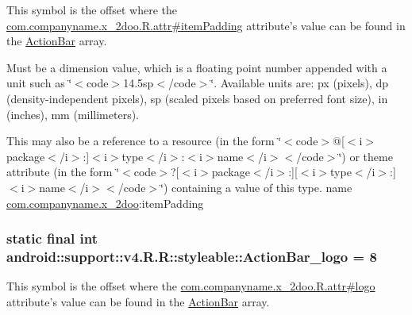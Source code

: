 This symbol is the offset where the \hyperlink{classcom_1_1companyname_1_1x__2doo_1_1_r_1_1attr_7e7c0aab964f70ae22793222d508c798}{com.companyname.x\_\-2doo.R.attr\#itemPadding} attribute's value can be found in the \hyperlink{classandroid_1_1support_1_1v4_1_1_r_1_1styleable_5c6cf2c83551ebae05f365bb913fdddf}{ActionBar} array.

Must be a dimension value, which is a floating point number appended with a unit such as \char`\"{}$<$code$>$14.5sp$<$/code$>$\char`\"{}. Available units are: px (pixels), dp (density-independent pixels), sp (scaled pixels based on preferred font size), in (inches), mm (millimeters). 

This may also be a reference to a resource (in the form \char`\"{}$<$code$>$@\mbox{[}$<$i$>$package$<$/i$>$:\mbox{]}$<$i$>$type$<$/i$>$:$<$i$>$name$<$/i$>$$<$/code$>$\char`\"{}) or theme attribute (in the form \char`\"{}$<$code$>$?\mbox{[}$<$i$>$package$<$/i$>$:\mbox{]}\mbox{[}$<$i$>$type$<$/i$>$:\mbox{]}$<$i$>$name$<$/i$>$$<$/code$>$\char`\"{}) containing a value of this type.  name \hyperlink{namespacecom_1_1companyname_1_1x__2doo}{com.companyname.x\_\-2doo}:itemPadding \hypertarget{classandroid_1_1support_1_1v4_1_1_r_1_1styleable_239d55172c67152fbf4c566f3de2f586}{
\subsubsection[{ActionBar\_\-logo}]{\setlength{\rightskip}{0pt plus 5cm}static final int android::support::v4.R.R::styleable::ActionBar\_\-logo = 8}}
\label{classandroid_1_1support_1_1v4_1_1_r_1_1styleable_239d55172c67152fbf4c566f3de2f586}


This symbol is the offset where the \hyperlink{classcom_1_1companyname_1_1x__2doo_1_1_r_1_1attr_65ce28e23e047ab5f1cd39aeb8daa20c}{com.companyname.x\_\-2doo.R.attr\#logo} attribute's value can be found in the \hyperlink{classandroid_1_1support_1_1v4_1_1_r_1_1styleable_5c6cf2c83551ebae05f365bb913fdddf}{ActionBar} array.


